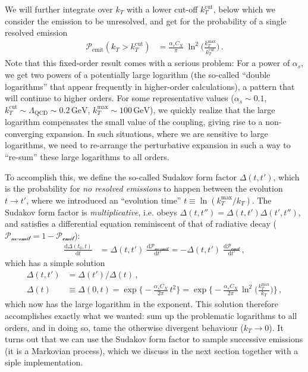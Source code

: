 \documentclass[11pt]{article}
\begin{document}
We will further integrate over \(k_T\) with a lower cut-off \(k_T^\mathrm{cut}\), below which we consider the emission to be unresolved, and get for the probability of a single resolved emission
\begin{align}
  \mathcal{P}_\text{emit}(k_T>k_T^\mathrm{cut})
  &=
  \frac{\alpha_s C_X}{\pi} \; \ln^2\biggl(\frac{k_T^\mathrm{max}}{k_T^\mathrm{cut}}\biggr)
  \,.
\end{align}
Note that this fixed-order result comes with a serious problem: For a power of \(\alpha_s\), we get two powers of a potentially large logarithm (the so-called ``double logarithms'' that appear frequently in higher-order calculations), a pattern that will continue to higher orders.
For some representative values (\(\alpha_s \sim 0.1\), \(k_T^\mathrm{cut} \sim \Lambda_\mathrm{QCD} \sim 0.2\,\mathrm{GeV}\), \(k_T^\mathrm{max} \sim 100\,\mathrm{GeV}\)), we quickly realize that the large logarithm compensates the small value of the coupling, giving rise to a non-converging expansion.
In such situations, where we are sensitive to large logarithms, we need to re-arrange the perturbative expansion in such a way to ``re-sum'' these large logarithms to all orders.

To accomplish this, we define the so-called Sudakov form factor \(\Delta(t,t')\), which is the probability for \emph{no resolved emissions} to happen between the evolution \(t \to t'\), where we introduced an ``evolution time'' \(t\equiv\ln(k_T^\mathrm{max}/k_T)\).
The Sudakov form factor is \emph{multiplicative}, i.e. obeys \(\Delta(t,t'') = \Delta(t,t') \Delta(t',t'')\), and satisfies a differential equation reminiscent of that of radiative decay (\(\mathcal{P_\text{no-emit}} = 1-\mathcal{P_\text{emit}}\)):
\begin{align}
\label{eq:Dsud}
  \frac{\mathrm{d}\Delta(t_0,t)}{\mathrm{d}t}
  &=
  \Delta(t,t') \; \frac{\mathrm{d}\mathcal{P_\text{no-emit}}}{\mathrm{d}t'}
  =
  - \Delta(t,t') \; \frac{\mathrm{d}\mathcal{P_\text{emit}}}{\mathrm{d}t'}
  \,,
\end{align}
which has a simple solution
\begin{align}
\label{eq:sud}
  \Delta(t,t')
  &=
  \Delta(t') / \Delta(t)
  \,,\nonumber\\
  \Delta(t)
  &\equiv \Delta(0,t)
  =
  \exp\biggl\{-\frac{\alpha_s C_X}{2\pi} \, t^2 \biggr\}
  =
  \exp\biggl\{-\frac{\alpha_s C_X}{2\pi} \, \ln^2\biggl(\frac{k_T^\mathrm{max}}{k_T}\biggr) \biggr\}
  \,,
\end{align}
which now has the large logarithm in the exponent.
This solution therefore accomplishes exactly what we wanted: sum up the problematic logarithms to all orders, and in doing so, tame the otherwise divergent behaviour (\(k_T\to0\)).
It turns out that we can use the Sudakov form factor to sample successive emissions (it is a Markovian process), which we discuss in the next section together with a siple implementation.
\end{document}
